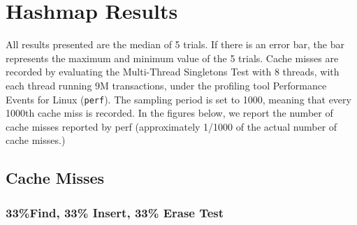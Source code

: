 \chapter{Hashmap Results}
\label{app:hashmaps}

All results presented are the median of 5 trials. If there is an error bar, the bar represents the maximum and minimum value of the 5 trials.
Cache misses are recorded by evaluating the Multi-Thread Singletons Test with 8 threads, with each thread running 9M transactions, under the profiling tool Performance Events for Linux (\texttt{perf}). The sampling period is set to 1000, meaning that every 1000th cache miss is recorded.
In the figures below, we report the number of cache misses reported by perf (approximately 1/1000 of the actual number of cache misses.)

\section{Cache Misses}

\subsection{33\%Find, 33\% Insert, 33\% Erase Test}

